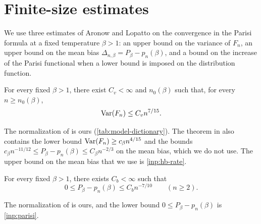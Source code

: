 \section{Finite-size estimates}\label{sec:inp-finite}

We use three estimates of Aronow and Lopatto on the convergence in the Parisi
formula at a fixed temperature $\beta>1$: an upper bound on the variance of
$F_n$, an upper bound on the mean bias $\Delta_{n,\beta}=P_\beta-p_n(\beta)$,
and a bound on the increase of the Parisi functional when a lower bound is
imposed on the distribution function.

\begin{theorem}\label{inp:qp-rate}
For every fixed $\beta>1$, there exist $C_v<\infty$ and $n_0(\beta)$ such that,
for every $n\ge n_0(\beta)$,
\begin{equation}\label{b:eq:external-rate}
 \operatorname{Var}(F_n)\le C_vn^{7/15}.
\end{equation}
\end{theorem}

The normalization of \cite[(1.1)--(1.2)]{quantitative-parisi} is ours
(\cref{tab:model-dictionary}). The theorem in \cite{quantitative-parisi} also
contains the lower bound $\operatorname{Var}(F_n)\ge c_\beta n^{4/15}$ and the bounds
$c_\beta n^{-11/12}\le P_\beta-p_n(\beta)\le C_\beta n^{-2/3}$ on the mean bias,
which we do not use. The upper bound on the mean bias that we use is
\cref{inp:hb-rate}.

\begin{theorem}\label{inp:hb-rate}
For every fixed $\beta>1$, there exists $C_b<\infty$ such that
\[
 0\le P_\beta-p_n(\beta)\le C_b n^{-7/10}\qquad(n\ge2).
\]
\end{theorem}

The normalization of \cite[Section~1.1]{hexagon-bias} is ours, and the lower
bound $0\le P_\beta-p_n(\beta)$ is \cref{inp:parisi}.

